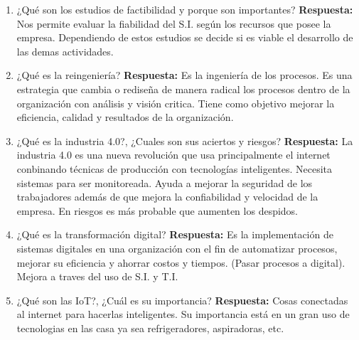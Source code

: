 \documentclass{templateNote}
\begin{document}
\begin{enumerate}
    \item ¿Qué son los estudios de factibilidad y porque son importantes?\newline
    \textbf{Respuesta:} Nos permite evaluar la fiabilidad del S.I. según los recursos que posee la empresa. Dependiendo de estos estudios se decide si es viable el desarrollo de las demas actividades.

    \item ¿Qué es la reingeniería?\newline
    \textbf{Respuesta:} Es la ingeniería de los procesos. Es una estrategia que cambia o rediseña de manera radical los procesos dentro de la organización con análisis y visión critica. Tiene como objetivo mejorar la eficiencia, calidad y resultados de la organización.

    \item ¿Qué es la industria 4.0?, ¿Cuales son sus aciertos y riesgos?\newline
    \textbf{Respuesta:} La industria 4.0 es una nueva revolución que usa principalmente el internet conbinando técnicas de producción con tecnologías inteligentes. Necesita sistemas para ser monitoreada. Ayuda a mejorar la seguridad de los trabajadores además de que mejora la confiabilidad y velocidad de la empresa. En riesgos es más probable que aumenten los despidos.

    \item ¿Qué es la transformación digital?\newline
    \textbf{Respuesta:} Es la implementación de sistemas digitales en una organización con el fin de automatizar procesos, mejorar su eficiencia y ahorrar costos y tiempos. (Pasar procesos a digital). Mejora a traves del uso de S.I. y T.I.

    \item ¿Qué son las IoT?, ¿Cuál es su importancia?\newline
    \textbf{Respuesta:} Cosas conectadas al internet para hacerlas inteligentes. Su importancia está en un gran uso de tecnologias en las casa ya sea refrigeradores, aspiradoras, etc.
\end{enumerate}

\newpage
\end{document}
